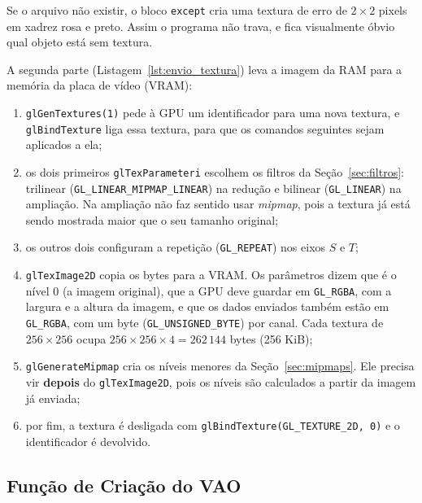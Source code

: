 \documentclass{article}
\begin{document}
Se o arquivo não existir, o bloco \texttt{except} cria uma textura de erro de $2\times2$ pixels em xadrez rosa e preto. Assim o programa não trava, e fica visualmente óbvio qual objeto está sem textura.



A segunda parte (Listagem~\ref{lst:envio_textura}) leva a imagem da RAM para a memória da placa de vídeo (VRAM):

\begin{enumerate}
    \item \texttt{glGenTextures(1)} pede à GPU um identificador para uma nova textura, e \texttt{glBindTexture} liga essa textura, para que os comandos seguintes sejam aplicados a ela;
    \item os dois primeiros \texttt{glTexParameteri} escolhem os filtros da Seção~\ref{sec:filtros}: trilinear (\texttt{GL\_LINEAR\_MIPMAP\_LINEAR}) na redução e bilinear (\texttt{GL\_LINEAR}) na ampliação. Na ampliação não faz sentido usar \textit{mipmap}, pois a textura já está sendo mostrada maior que o seu tamanho original;
    \item os outros dois configuram a repetição (\texttt{GL\_REPEAT}) nos eixos $S$ e $T$;
    \item \texttt{glTexImage2D} copia os bytes para a VRAM. Os parâmetros dizem que é o nível 0 (a imagem original), que a GPU deve guardar em \texttt{GL\_RGBA}, com a largura e a altura da imagem, e que os dados enviados também estão em \texttt{GL\_RGBA}, com um byte (\texttt{GL\_UNSIGNED\_BYTE}) por canal. Cada textura de $256\times256$ ocupa $256 \times 256 \times 4 = 262\,144$ bytes (256 KiB);
    \item \texttt{glGenerateMipmap} cria os níveis menores da Seção~\ref{sec:mipmaps}. Ele precisa vir \textbf{depois} do \texttt{glTexImage2D}, pois os níveis são calculados a partir da imagem já enviada;
    \item por fim, a textura é desligada com \texttt{glBindTexture(GL\_TEXTURE\_2D, 0)} e o identificador é devolvido.
\end{enumerate}



\subsection{Função de Criação do VAO}
\end{document}
